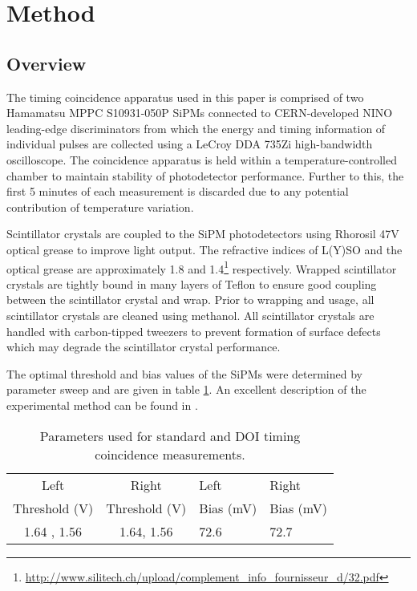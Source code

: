 \section{Method}
\subsection{Overview}
The timing coincidence apparatus used in this paper is comprised of two Hamamatsu MPPC S10931-050P SiPMs connected to CERN-developed NINO leading-edge discriminators from which the energy and timing information of individual pulses are collected using a LeCroy DDA 735Zi high-bandwidth oscilloscope. The coincidence apparatus is held within a temperature-controlled chamber to maintain stability of photodetector performance. Further to this, the first 5 minutes of each measurement is discarded due to any potential contribution of temperature variation.

Scintillator crystals are coupled to the SiPM photodetectors using Rhorosil 47V optical grease to improve light output. The refractive indices of L(Y)SO and the optical grease are approximately 1.8 and 1.4\footnote{\href{http://www.silitech.ch/upload/complement_info_fournisseur_d/32.pdf}{http://www.silitech.ch/upload/complement_info_fournisseur_d/32.pdf}} respectively. Wrapped scintillator crystals are tightly bound in many layers of Teflon to ensure good coupling between the scintillator crystal and wrap. Prior to wrapping and usage, all scintillator crystals are cleaned using methanol. All scintillator crystals are handled with carbon-tipped tweezers to prevent formation of surface defects which may degrade the scintillator crystal performance. 

The optimal threshold and bias values of the SiPMs were determined by parameter sweep and are given in table \ref{tab:optimumparam}. An excellent description of the experimental method can be found in \cite{ch_Meyer_Pizzichemi_Lecoq_2013}.

\begin{table}
\caption{\label{tab:optimumparam} Parameters used for standard and DOI timing coincidence measurements.} 
\begin{tabular}{ccll}
\hline
Left &  Right & Left & Right\\
Threshold (V) & Threshold (V)& Bias (mV) & Bias (mV)\\
\hline
1.64 , 1.56 &  1.64, 1.56 &  72.6 &  72.7\\
\hline
\end{tabular}
\end{table}


